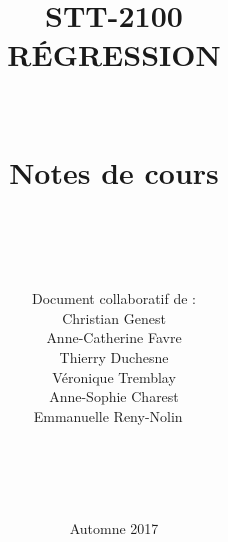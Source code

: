 \documentclass[MSc,english,french, 12pt ]{ulthese}
\begin{document}
\title{STT-2100\\
RÉGRESSION\\
{\ }\\ {\ }\\
Notes de cours\\

{\ }\\ {\ }\\
}
\author{Document collaboratif de : \\
Christian Genest \\
 Anne-Catherine Favre\\
 Thierry Duchesne \\
 Véronique Tremblay\\
 Anne-Sophie Charest\\
 Emmanuelle Reny-Nolin
{\ }\\ {\ }\\ {\ }\\ {\ }\\ {\ }\\
}
\date{Automne 2017}


\maketitle
\thispagestyle{empty}



\cleardoublepage

\tableofcontents                %
\cleardoublepage

\listoftables                   %
\cleardoublepage

\listoffigures                  %
\cleardoublepage



%











\appendix



\nocite{*}
\end{document}
